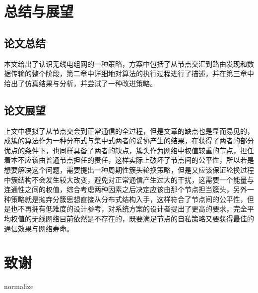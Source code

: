 \documentclass[a4paper,AutoFakeBold,oneside,12pt]{book}
\begin{document}
  \chapter{总结与展望}
\section{论文总结}
  本文给出了认识无线电组网的一种策略，方案中包括了从节点交汇到路由发现和数据传输的整个阶段，第二章中详细地对算法的执行过程进行了描述，并在第三章中给出了仿真结果与分析，并尝试了一种改进策略。
 \section{论文展望}
  上文中模拟了从节点交会到正常通信的全过程，但是文章的缺点也是显而易见的，成簇的算法作为一种分布式与集中式两者的妥协产生的结果，在获得了两者的部分优点的条件下，也同样具备了两者的缺点，簇头作为网络中权值较重的节点，担任着本不应该由普通节点担任的责任，这样实际上破坏了节点间的公平性，所以若是想要解决这个问题，需要提出一种周期性簇头轮换策略，但是又应该保证轮换过程中簇结构不会发生较大改变，避免对正常通信产生过大的干扰，这需要一个能量与连通性之间的权值，综合考虑两种因素之后决定应该由那个节点担当簇头，另外一种策略就是抛弃分簇思想直接从分布式结构入手，这样符合了节点间的公平性，但是也不再拥有低难度的设计参考，对系统方案的设计者提出了更高的要求，完全平均权值的无线网络目前依然是不存在的，既要满足节点的自私策略又要获得最佳的通信效果与网络寿命。
\clearpage{}


\clearpage{}
\chapter*{致\qquad{}谢}
  normalize



\end{document}
